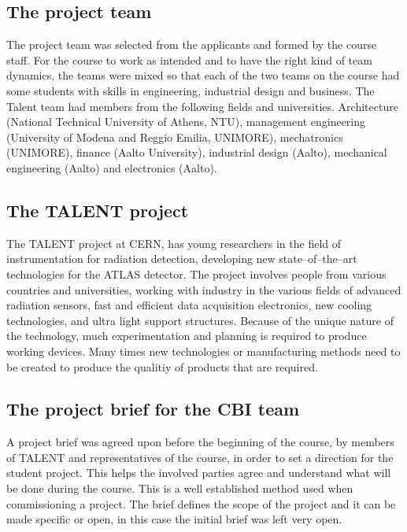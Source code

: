 \documentclass[english,12pt,a4paper,pdftex]{article}
\begin{document}
\subsection{The project team}

The project team was selected from the applicants and formed by the course staff. For the course to work as intended and to have the right kind of team dynamics, the teams were mixed so that each of the two teams on the course had some students with skills in engineering, industrial design and business. The Talent team had members from the following fields and universities. Architecture (National Technical University of Athens, NTU), management engineering (University of Modena and Reggio Emilia, UNIMORE), mechatronics (UNIMORE), finance (Aalto University), industrial design (Aalto), mechanical engineering (Aalto) and electronics (Aalto).


\subsection{The TALENT project}

The TALENT project at CERN, has young researchers in the field of instrumentation for radiation detection, developing new state--of--the--art technologies for the ATLAS detector. The project involves people from various countries and universities, working with industry in the various fields of advanced radiation sensors, fast and efficient data acquisition electronics, new cooling technologies, and ultra light support structures. Because of the unique nature of the technology, much experimentation and planning is required to produce working devices. Many times new technologies or manufacturing methods need to be created to produce the qualitiy of products that are required.


\subsection{The project brief for the CBI team}

A project brief was agreed upon before the beginning of the course, by members of TALENT and representatives of the course, in order to set a direction for the student project. This helps the involved parties agree and understand what will be done during the course. This is a well established method used when commissioning a project. The brief defines the scope of the project and it can be made specific or open, in this case the initial brief was left very open.
\end{document}
